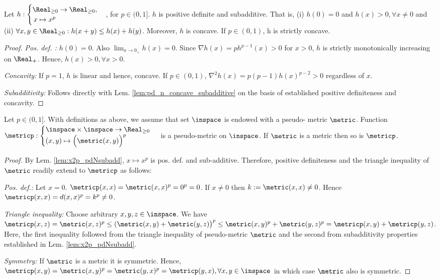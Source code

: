 \begin{lem} \label{lem:x2p_pdNsubadd}
 Let $h: \begin{cases} \Real_{\geq 0} \to \Real_{\geq 0},\\ \, x \mapsto x^p\end{cases}$, for $p \in (0,1] $. $h$ is positive definite and subadditive. 
 That is, (i) $h(0) = 0 $ and  $h(x) > 0, \forall x \neq 0$ and (ii) $\forall x,y \in \Real_{\geq 0}: h(x+y) \leq h(x) + h(y)  $.
 Moreover, $h$ is concave. If $p \in (0,1)$, h is strictly concave. 
 
\begin{proof}
\textit{Pos. def. :} $h(0) = 0$.  Also $\lim_{x \to 0_+} h(x) =0$. Since $\nabla h (x) = p h^{p-1}(x) >0 $ for $x >0$, $h$ is strictly monotonically increasing on $\Real_+$. Hence, $h(x) > 0, \forall x >0$. 

\textit{Concavity:} If $p =1$, $h$ is linear and hence, concave. If $p \in (0,1)$, $\nabla^2 h(x) = p (p-1) h(x)^{p-2} > 0$ regardless of $x$.

\textit{Subadditivity:} Follows directly with Lem. \ref{lem:pd_n_concave_subadditive} on the basis of established positive definiteness and concavity.
\end{proof}
\end{lem}



\begin{lem}\label{lem:hoeldererror_metric}
Let $p \in (0,1]$.
With definitions as above, we assume that set $\inspace$ is endowed with a pseudo- metric $\metric$. Function
$\metricp: \begin{cases} \inspace \times \inspace \to \Real_{\geq 0} \\ (x,y) \mapsto \Bigl(\metric(x,y)\Bigr)^p \end{cases}$ is a pseudo-metric on $\inspace$.
If $\metric$ is a metric then so is $\metricp$.
\begin{proof}
 By Lem. \ref{lem:x2p_pdNsubadd}, $x\mapsto x^p$ is pos. def. and sub-additive. Therefore, positive definiteness and the triangle inequality of $\metric$ readily extend to $\metricp$ as follows: 

\textit{Pos. def.:}
Let $x=0$. $\metricp(x,x) = \metric(x,x)^p = 0^p = 0$. If $x \neq 0$ then $k :=\metric(x,x) \neq 0$. Hence   $\metricp(x,x) = d(x,x)^p = k^p \neq 0$.

\textit{Triangle inequality:}
Choose arbitrary $x,y,z \in \inspace $. We have $\metricp(x,z) = \metric(x,z)^p \leq (\metric(x,y) + \metric(y,z) \bigr)^p \leq \metric(x,y)^p + \metric(y,z)^p = \metricp(x,y) + \metricp(y,z)$. Here, the first inequality followed from the triangle inequality of pseudo-metric $\metric$ and the second from subadditivity properties established in Lem. \ref{lem:x2p_pdNsubadd}.

\textit{Symmetry:} If $\metric$ is a metric it is symmetric. Hence, $\metricp(x,y) = \metric(x,y)^p = \metric(y,x)^p = \metricp(y,x), \forall x,y \in \inspace $ in which case $\metric$ also is symmetric.
\end{proof}
\end{lem}


